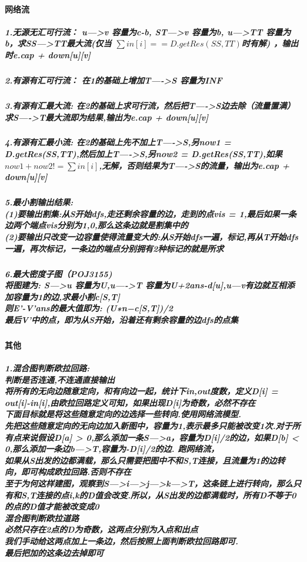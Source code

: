 \documentclass{article}
\begin{document}
\paragraph{网络流}
\subparagraph{1.无源无汇可行流： u--->v 容量为c-b, ST--->v 容量为b, u--->TT 容量为b，求SS--->TT最大流(仅当 $\sum in[i] == D.getRes(SS,TT)$时有解) ，输出时e.cap + down[u][v]}
\subparagraph{2.有源有汇可行流： 在1的基础上增加T---->S 容量为INF}
\subparagraph{3.有源有汇最大流: 在2的基础上求可行流，然后把T---->S边去除（流量置满） 求S---->T最大流即为结果,输出为e.cap + down[u][v]}
\subparagraph{4.有源有汇最小流: 在2的基础上先不加上T---->S,另now1 = D.getRes(SS,TT),然后加上T---->S,另now2 = D.getRes(SS,TT),如果$now1 + now2 != \sum in[i]$,无解，否则结果为T---->S的流量，输出为e.cap + down[u][v]}
\subparagraph{5.最小割输出结果: \\
(1)要输出割集:从S开始dfs,走还剩余容量的边，走到的点vis = 1,最后如果一条边两个端点vis分别为1,0,那么这条边就是割集中的 \\
(2)要输出只改变一边容量使得流量变大的:从S开始dfs一遍，标记,再从T开始dfs一遍，再次标记，一条边的端点分别拥有2种标记的就是所求}
\subparagraph{6.最大密度子图（POJ3155)　\\
将图建为: S—>u 容量为U,u—->T 容量为U+2ans-d[u],u—v有边就互相添加容量为1的边,求最小割c[S,T] \\
则E’-V’ans的最大值即为: (U∗n−c[S,T])/2 \\ 
最后V’中的点，即为从S开始，沿着还有剩余容量的边dfs的点集}
\paragraph{其他}
\subparagraph{1.混合图判断欧拉回路: \\
判断是否连通,不连通直接输出 \\
将所有的无向边随意定向，和有向边一起，统计下in,out度数，定义D[i] = out[i]-in[i],由欧拉回路定义可知，如果出现D[i]为奇数，必然不存在 \\
下面目标就是将这些随意定向的边选择一些转向.使用网络流模型.\\先把这些随意定向的无向边加入新图中，容量为1,表示最多只能被改变1次.对于所有点来说假设D[a] > 0,那么添加一条S—>a，容量为D[i]/2的边，如果D[b] < 0,那么添加一条边b—>T,容量为-D[i]/2的边. 跑网络流，\\如果从S出发的边都满载，那么只需要把图中不和S,T连接，且流量为1的边转向，即可构成欧拉回路.否则不存在\\
至于为何这样建图，观察到S—>i—>j—>k—>T，这条链上进行转向，那么只有和S,T连接的点i,k的D值会改变.所以，从S出发的边都满载时，所有D不等于0的点的D值才能被改变成0\\
混合图判断欧拉道路\\
必然只存在2点的D为奇数，这两点分别为入点和出点\\
我们手动给这两点加上一条边，然后按照上面判断欧拉回路即可.\\
最后把加的这条边去掉即可\\}
\end{document}
